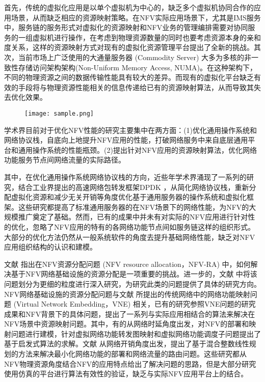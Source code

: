 首先，传统的虚拟化应用是以单个虚拟机为中心的，缺乏多个虚拟机协同合作的应用场景，从而缺乏相应的资源映射策略。在NFV实际应用场景下，尤其是IMS服务中，服务链的服务形式对虚拟化的资源映射和NFV业务的管理编排需要对协同服务的一组虚拟机进行操作，在考虑到物理资源数量的同时也要考虑资源本身的亲和度关系，这样的资源映射方式对现有的虚拟化资源管理平台提出了全新的挑战。其次，当前市场上广泛使用的大通量服务器 (Commodity Server) 大多为多核的非一致性存储访问架构架构(Non-Uniform Memory Access, NUMA)。在这种架构下，不同的物理资源之间的数据传输性能具有较大的差异。而现有的虚拟化平台缺乏有效的手段将与物理资源性能相关的信息传递给已有的资源映射算法，从而导致其失去优化效果。
\begin{figure}[!htp]
	\centering
	\texttt{[image: sample.png]}
\end{figure}
		
学术界目前对于优化NFV性能的研究主要集中在两方面：(1)优化通用操作系统和网络协议栈，自底向上地提升NFV应用的性能，打破网络服务中来自底层通用平台和通用操作系统的性能瓶颈。(2)提出针对NFV应用的资源映射算法，优化网络功能服务节点间网络流量的实际路径。

其中，在优化通用操作系统网络协议栈的方向，近些年学术界涌现了一系列的研究，结合工业界提出的高速网络包转发框架DPDK  ，从简化网络协议栈，重新分配虚拟化资源和减少无关开销等角度优化基于通用服务器的操作系统和虚拟化框架。这些研究都提高了标准通用服务器的在NFV场景下的网络性能，为NFV的大规模推广奠定了基础。然而，已有的成果中并未有对实际的NFV应用进行针对性的优化，忽略了NFV应用的特有的各网络功能节点间如服务链这样的组织形式。大部分的优化方法仍然从一般系统软件的角度去提升基础网络性能，缺乏对NFV应用组织结构的认识和建模。

文献  指出在NFV资源分配问题 (NFV resource allocation，NFV-RA) 中，如何解决基于NFV网络基础设施的资源分配是一项重要的挑战。进一步的，文献  中将该问题划分为更细的粒度进行深入研究，为研究此类的问题提供了具体的研究方向。NFV网络基础设施的资源分配问题与文献  所提出的传统网络中的网络功能映射问题 (Virtual Network Embedding，VNE) 相关，已有的研究参照VNE问题的研究成果和NFV背景下的具体问题，提出了一系列与实际应用相结合的算法来解决在NFV场景中资源映射问题。其中，有的从网络时延角度出发，对NFV的部署和映射问题进行建模，针对虚拟网络功能转发图映射和虚拟网络功能调度子问题提出了基于启发式算法的求解。文献  从网络开销角度出发，提出了基于混合整数线性规划的方法来解决最小化网络功能的部署和网络流量的路由问题。这些研究都从NFV物理资源角度结合NFV的应用特点给出了解决问题的思路，但是大部分研究使用仿真的平台进行算法有效性的验证，缺乏与实际NFV应用平台上的结合。

